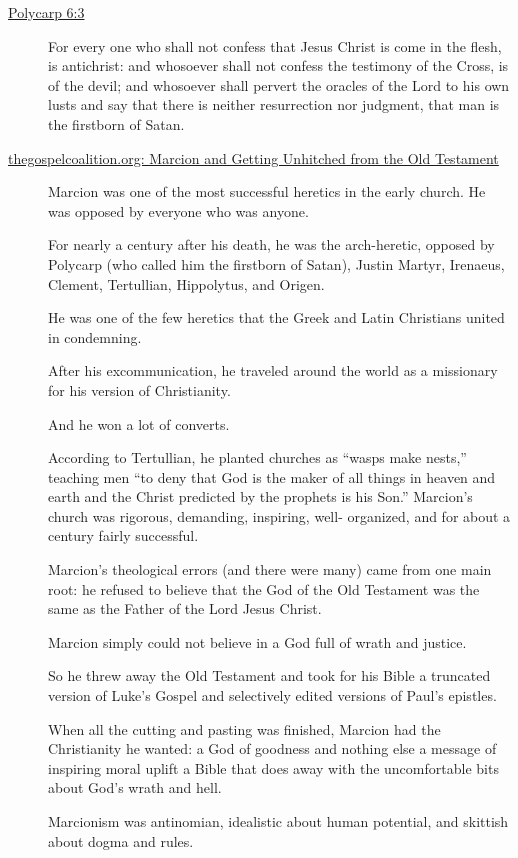 \documentclass[11pt]{article}
\begin{document}
\begin{description}
\item[{\href{https://www.earlychristianwritings.com/text/polycarp-lightfoot.html}{Polycarp 6:3}}] For every one who shall not confess that Jesus Christ is come in the flesh, is antichrist: and whosoever shall not confess the testimony of the Cross, is of the devil; and whosoever shall pervert the oracles of the Lord to his own lusts and say that there is neither resurrection nor judgment, that man is the firstborn of Satan.

\item[{\href{https://www.thegospelcoalition.org/blogs/kevin-deyoung/marcion-getting-unhitched-old-testament/}{thegospelcoalition.org: Marcion and Getting Unhitched from the Old Testament}}] Marcion was one of the most successful heretics in the early church.
He was opposed by everyone who was anyone.

For nearly a century after his death, he was
the arch-heretic, opposed by Polycarp (who
called him the firstborn of Satan), Justin
Martyr, Irenaeus, Clement, Tertullian,
Hippolytus, and Origen.

He was one of the few heretics that the Greek
and Latin Christians united in condemning.

After his excommunication, he traveled around
the world as a missionary for his version of
Christianity.

And he won a lot of converts.

According to Tertullian, he planted churches
as “wasps make nests,” teaching men “to deny
that God is the maker of all things in heaven
and earth and the Christ predicted by the
prophets is his Son.” Marcion’s church was
rigorous, demanding, inspiring, well-
organized, and for about a century fairly
successful.

Marcion’s theological errors (and there were
many) came from one main root: he refused to
believe that the God of the Old Testament was
the same as the Father of the Lord Jesus
Christ.

Marcion simply could not believe in a God full
of wrath and justice.

So he threw away the Old Testament and took
for his Bible a truncated version of Luke’s
Gospel and selectively edited versions of
Paul’s epistles.

When all the cutting and pasting was finished,
Marcion had the Christianity he wanted: a God
of goodness and nothing else a message of
inspiring moral uplift a Bible that does away
with the uncomfortable bits about God’s wrath
and hell.

Marcionism was antinomian, idealistic about
human potential, and skittish about dogma and
rules.
\end{description}
\end{document}

